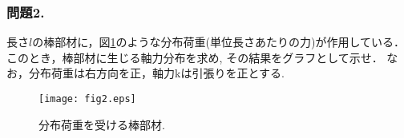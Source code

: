\documentclass[10pt,a4j]{jarticle}
\begin{document}
\subsubsection*{問題2.} 
長さ$l$の棒部材に，図\ref{fig:fig2}のような分布荷重(単位長さあたりの力)が作用している．
このとき，棒部材に生じる軸力分布を求め, その結果をグラフとして示せ．
なお，分布荷重は右方向を正，軸力kは引張りを正とする.
\begin{figure}[h]
	\begin{center}
	\texttt{[image: fig2.eps]} 
	\end{center}
	\vspace{-5mm}
	\caption{分布荷重を受ける棒部材.} 
	\label{fig:fig2}
\end{figure}
\end{document}
